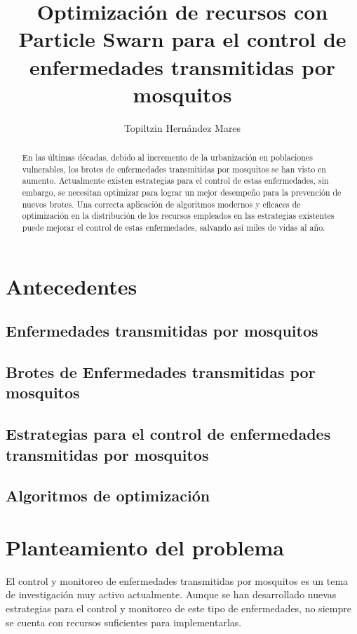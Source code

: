 \documentclass[letterpaper, 10pt, conference]{ieeeconf}
\title{\bf
  Optimización de recursos con Particle Swarn para el control de enfermedades transmitidas por mosquitos
}
\author{Topiltzin Hernández Mares}
\begin{document}
\maketitle
\thispagestyle{empty}
\pagestyle{empty}

\begin{abstract}
  En las últimas décadas, debido al incremento de la urbanización en poblaciones vulnerables, los brotes de enfermedades transmitidas por mosquitos se han visto en aumento. Actualmente existen estrategias para el control de estas enfermedades, sin embargo, se necesitan optimizar para lograr un mejor desempeño para la prevención de nuevos brotes. Una correcta aplicación de algoritmos modernos y eficaces de optimización en la distribución de los recursos empleados en las estrategias existentes puede mejorar el control de estas enfermedades, salvando así miles de vidas al año.
\end{abstract}

\section{Antecedentes}

\subsection{Enfermedades transmitidas por mosquitos}

\subsection{Brotes de Enfermedades transmitidas por mosquitos}

\subsection{Estrategias para el control de enfermedades transmitidas por mosquitos}

\subsection{Algoritmos de optimización}

\section{Planteamiento del problema}
El control y monitoreo de enfermedades transmitidas por mosquitos es un tema de investigación muy activo actualmente\cite{AltStrategies}. Aunque se han desarrollado nuevas estrategias para el control y monitoreo de este tipo de enfermedades, no siempre se cuenta con recursos suficientes para implementarlas.
\end{document}
